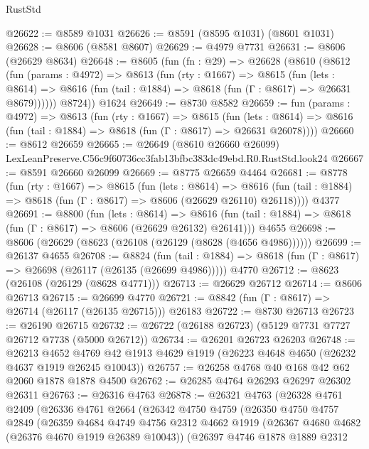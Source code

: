 \begin{lexlean}{RustStd}
\begin{coremodule}
@26622 := @8589 @1031
@26626 := @8591 (@8595 @1031) (@8601 @1031)
@26628 := @8606 (@8581 @8607)
@26629 := @4979 @7731
@26631 := @8606 (@26629 @8634)
@26648 := @8605
    (fun (fn : @29) =>
    @26628
      (@8610
        (@8612
          (fun (params : @4972) =>
          @8613
            (fun (rty : @1667) =>
            @8615
              (fun (lets : @8614) =>
              @8616 (fun (tail : @1884) => @8618 (fun (Γ : @8617) => @26631 @8679))))))
        @8724))
    @1624
@26649 := @8730 @8582
@26659 := fun (params : @4972) =>
  @8613
    (fun (rty : @1667) =>
    @8615
      (fun (lets : @8614) =>
      @8616 (fun (tail : @1884) => @8618 (fun (Γ : @8617) => @26631 @26078))))
@26660 := @8612 @26659
@26665 := @26649
    (@8610 @26660 @26099)
    LexLeanPreserve.C56c9f60736cc3fab13bfbc383dc49ebd.R0.RustStd.look24
@26667 := @8591 @26660 @26099
@26669 := @8775 @26659 @4464
@26681 := @8778
    (fun (rty : @1667) =>
    @8615
      (fun (lets : @8614) =>
      @8616 (fun (tail : @1884) => @8618 (fun (Γ : @8617) => @8606 (@26629 @26110) @26118))))
    @4377
@26691 := @8800
    (fun (lets : @8614) =>
    @8616 (fun (tail : @1884) => @8618 (fun (Γ : @8617) => @8606 (@26629 @26132) @26141)))
    @4655
@26698 := @8606 (@26629 (@8623 (@26108 (@26129 (@8628 (@4656 @4986))))))
@26699 := @26137 @4655
@26708 := @8824
    (fun (tail : @1884) => @8618 (fun (Γ : @8617) => @26698 (@26117 (@26135 (@26699 @4986)))))
    @4770
@26712 := @8623 (@26108 (@26129 (@8628 @4771)))
@26713 := @26629 @26712
@26714 := @8606 @26713
@26715 := @26699 @4770
@26721 := @8842 (fun (Γ : @8617) => @26714 (@26117 (@26135 @26715))) @26183
@26722 := @8730 @26713
@26723 := @26190 @26715
@26732 := @26722 (@26188 @26723) (@5129 @7731 @7727 @26712 @7738 (@5000 @26712))
@26734 := @26201 @26723 @26203
@26748 := @26213
    @4652
    @4769
    @42
    @1913
    @4629
    @1919
    (@26223 @4648 @4650 (@26232 @4637 @1919 @26245 @10043))
@26757 := @26258 @4768 @40 @168 @42 @62 @2060 @1878 @1878 @4500
@26762 := @26285 @4764 @26293 @26297 @26302 @26311
@26763 := @26316 @4763
@26878 := @26321
    @4763
    (@26328
      @4761
      @2409
      (@26336
        @4761
        @2664
        (@26342
          @4750
          @4759
          (@26350
            @4750
            @4757
            @2849
            (@26359
              @4684
              @4749
              @4756
              @2312
              @4662
              @1919
              (@26367 @4680 @4682 (@26376 @4670 @1919 @26389 @10043))
              (@26397
                @4746
                @1878
                @1889
                @2312

\end{coremodule}
\end{lexlean}
